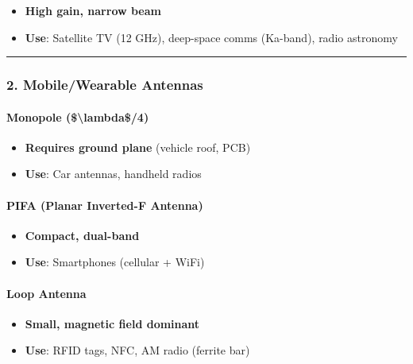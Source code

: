 \begin{itemize}
\tightlist
\item
  \textbf{High gain, narrow beam}
\item
  \textbf{Use}: Satellite TV (12 GHz), deep-space comms (Ka-band), radio
  astronomy
\end{itemize}

\begin{center}\rule{0.5\linewidth}{0.5pt}\end{center}

\subsubsection{2. Mobile/Wearable
Antennas}\label{mobilewearable-antennas}

\paragraph{Monopole
(\$\textbackslash lambda\$/4)}\label{monopole-ux3bb4}

\begin{itemize}
\tightlist
\item
  \textbf{Requires ground plane} (vehicle roof, PCB)
\item
  \textbf{Use}: Car antennas, handheld radios
\end{itemize}

\paragraph{PIFA (Planar Inverted-F
Antenna)}\label{pifa-planar-inverted-f-antenna}

\begin{itemize}
\tightlist
\item
  \textbf{Compact, dual-band}
\item
  \textbf{Use}: Smartphones (cellular + WiFi)
\end{itemize}

\paragraph{Loop Antenna}\label{loop-antenna}

\begin{itemize}
\tightlist
\item
  \textbf{Small, magnetic field dominant}
\item
  \textbf{Use}: RFID tags, NFC, AM radio (ferrite bar)
\end{itemize}


